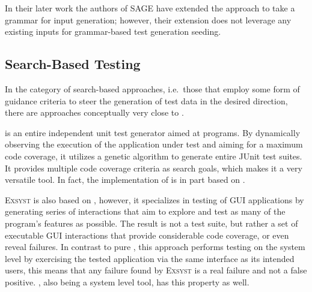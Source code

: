 In their later work \cite{Godefroid:2008:GWF:1375581.1375607} the authors of SAGE have extended the approach to
take a grammar for input generation; however, their extension does not leverage any existing inputs for
grammar-based test generation seeding.

\subsection{Search-Based Testing}
In the category of search-based approaches, i.e.\ those that employ some form of guidance criteria to steer the
generation of test data in the desired direction, there are approaches conceptually very close to \xmlmate.

\evosuite{}\cite{fraser2013whole} is an entire independent unit test generator aimed at \java programs. By
dynamically observing the execution of the application under test and aiming for a maximum code coverage, it
utilizes a genetic algorithm to generate entire JUnit test suites. It provides multiple code coverage
criteria as search goals, which makes it a very versatile tool. In fact, the implementation of \xmlmate is
in part based on \evosuite.

\textsc{Exsyst}\cite{gross-issta2012} is also based on \evosuite, however, it specializes in testing of \java
GUI applications by generating series of interactions that aim to explore and test as many of the program's
features as possible. The result is not a test suite, but rather a set of executable GUI interactions that
provide considerable code coverage, or even reveal failures. In contrast to pure \evosuite, this approach
performs testing on the system level by exercising the tested application via the same interface as its
intended users, this means that any failure found by \textsc{Exsyst} is a real failure and not a false
positive. \xmlmate, also being a system level tool, has this property as well.
